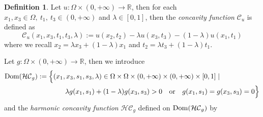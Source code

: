 \documentclass[11pt, reqno]{amsart}
\theoremstyle{definition}
\newtheorem{definition}[lemma]{Definition}
\numberwithin{equation}{section}
\newcommand{\R}{\mathbb{R}}
\newcommand{\Dom}{{\rm Dom}}
\newcommand{\tr}[1]{{\color{red} #1}}
\begin{document}
\begin{definition}\label{concavity function definition}
	Let $u\colon\Omega\times (0,+\infty) \to \R$, then for each $x_1,x_3\in \Omega, \ t_1, \ t_3\in (0,+\infty)$ and $\lambda \in [0,1]$, then the \emph{concavity function} $\mathcal{C}_u$ is defined as 
	\begin{equation}\label{defn concavity function}
		\mathcal{C}_u(x_1,x_3,t_1,t_3,\lambda):= u(x_2,t_2)-\lambda u(x_3,t_3)-(1-\lambda)u(x_1,t_1)
	\end{equation}
	where we recall $x_2=\lambda x_3+(1-\lambda)x_1$ and $t_2=\lambda t_3+(1-\lambda)t_1$. 
	
	Let $g\colon\Omega\times (0,+\infty)\to \R$, then 
we introduce
\begin{align*}
\Dom(\mathcal{HC}_g)&:= \Big\{ (x_1,x_3,s_1,s_3,\lambda) \in \Omega\times\Omega\times(0,+\infty)\times(0,+\infty)\times[0,1] \mid \\
& \qquad \qquad  \lambda g(x_1,s_1)+(1-\lambda)g(x_3,s_3)>0 \quad \hbox{or} \quad g(x_1,s_1)=g(x_3,s_3)=0\Big\}
\end{align*}
and the \emph{harmonic concavity function} $\mathcal{HC}_g$ defined on $\Dom(\mathcal{HC}_g)$ by %


\end{definition}
\end{document}
